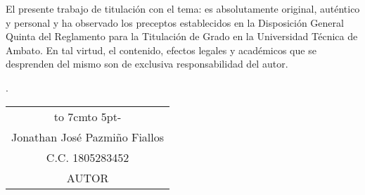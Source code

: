 \newpage
{}
El presente trabajo de titulaci\'on con el tema: {\MakeUppercase\tema} es absolutamente original, auténtico y personal y ha observado
los preceptos establecidos en la Disposición General Quinta del Reglamento para la
Titulación de Grado en la Universidad Técnica de Ambato. En tal virtud, el contenido,
efectos legales y académicos que se desprenden del mismo son de exclusiva
responsabilidad del autor.\begin{flushright}
	\lugarFechaPrelims.
\end{flushright}

\vspace*{5cm}
\begin{center}
	\begin{tabular}{c}
		\hbox to 7cm{\leaders\hbox to 5pt{\hss - \hss}\hfil} \\
		Jonathan José Pazmiño Fiallos                        \\
		C.C. 1805283452                                      \\
		AUTOR
	\end{tabular}
\end{center}
